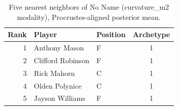 \begin{table}[htbp]
  \centering\small
  \begin{tabular}{rllc}
    \toprule
    Rank & Player & Position & Archetype \\
    \midrule
    1 & Anthony Mason & F & 1 \\
    2 & Clifford Robinson & F & 1 \\
    3 & Rick Mahorn & C & 1 \\
    4 & Olden Polynice & C & 1 \\
    5 & Jayson Williams & F & 1 \\
    \bottomrule
  \end{tabular}
  \caption{Five nearest neighbors of No Name (curvature_m2 modality), Procrustes-aligned posterior mean.}
  \label{tab:No_Name_neighbors_curvature_m2}
\end{table}

